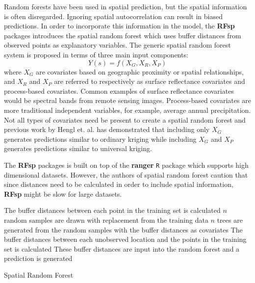 \documentclass{article}
\begin{document}
Random forests have been used in spatial prediction, but the spatial information is often disregarded\cite{hengl18}.
Ignoring spatial autocorrelation can result in biased predictions.
In order to incorporate this information in the model, the \textbf{RFsp} packages introduces the spatial random forest which uses buffer distances from observed points as explanatory variables.
The generic spatial random forest system is proposed in terms of three main input components:
$$
Y(s) = f(X_G, X_R, X_P)
$$
where $X_G$ are covariates based on geographic proximity or spatial relationships, and $X_R$ and $X_P$ are referred to respectively as surface reflectance covariates and process-based covariates.
Common examples of surface reflectance covariates would be spectral bands from remote sensing images.
Process-based covariates are more traditional independent variables, for example, average annual precipitation.
Not all types of covariates need be present to create a spatial random forest and previous work by Hengl et. al. has demonstrated that including only $X_G$ generates predictions similar to ordinary kriging while including $X_G$ and $X_P$ generates predictions similar to universal kriging\cite{hengl18}.

The \textbf{RFsp} packages is built on top of the \textbf{ranger} \texttt{R} package which supports high dimensional datasets.
However, the authors of spatial random forest caution that since distances need to be calculated in order to include spatial information, \textbf{RFsp} might be slow for large datasets.

\vspace{.5cm}

\begin{singlespace}
\begin{algorithm}[H]
\SetAlgoLined
{}
 {
	The buffer distances between each point in the training set is calculated\; 
	$n$ random samples are drawn with replacement from the training data\;
	$n$ trees are generated from the random samples with the buffer distances as covariates\;
	The buffer distances between each unobserved location and the points in the training set is calculated\; 
	These buffer distances are input into the random forest and a prediction is generated\; 
}
	\caption{Spatial Random Forest}
\end{algorithm}
\end{singlespace}
\end{document}
